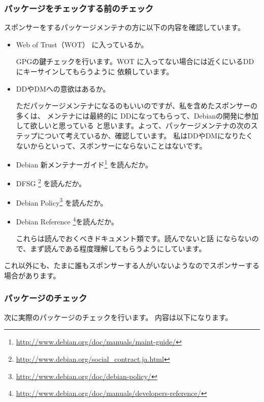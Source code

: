 \documentclass[mingoth,a4paper]{jsarticle}
\begin{document}
\subsubsection{パッケージをチェックする前のチェック}

スポンサーをするパッケージメンテナの方に以下の内容を確認しています。

\begin{itemize}
\item Web of Trust（WOT） に入っているか。

GPGの鍵チェックを行います。WOT に入ってない場合には近くにいるDDにキーサインしてもらうように
依頼しています。

\item DDやDMへの意欲はあるか。

ただパッケージメンテナになるのもいいのですが、私を含めたスポンサーの多くは、
メンテナには最終的に DDになってもらって、Debianの開発に参加して欲しいと思っている
と思います。よって、パッケージメンテナの次のステップについて考えているか、確認しています。
私はDDやDMになりたくないからといって、スポンサーにならないことはないです。

\item Debian 新メンテナーガイド\footnote{\url{http://www.debian.org/doc/manuals/maint-guide/}} を読んだか。
\item DFSG \footnote{\url{http://www.debian.org/social_contract.ja.html}} を読んだか。
\item Debian Policy\footnote{\url{http://www.debian.org/doc/debian-policy/}} を読んだか。
\item Debian Reference \footnote{\url{http://www.debian.org/doc/manuals/developers-reference/}}を読んだか。

これらは読んでおくべきドキュメント類です。読んでないと話
にならないので、まず読んである程度理解してもらうようにしています。

\end{itemize}

これ以外にも、たまに誰もスポンサーする人がいないようなのでスポンサーする場合があります。

\subsubsection{パッケージのチェック}

次に実際のパッケージのチェックを行います。
内容は以下になります。
\end{document}
